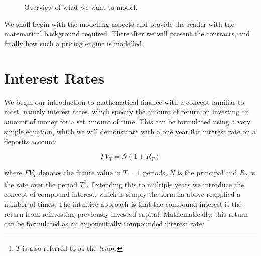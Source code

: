\begin{figure}[h!]
\begin{center}
\begin{minipage}{\linewidth}
\caption{Overview of what we want to model.}
\label{fig:overview}
\end{minipage}
\end{center}
\end{figure}

We shall begin with the modelling aspects and provide the reader with the
matematical background required. Thereafter we will present the contracts, and
finally how such a pricing engine is modelled. 

\section{Interest Rates}

We begin our introduction to mathematical finance with a concept familiar to
most, namely interest rates, which specify the amount of return on
investing an amount of money for a set amount of time. This can be formulated
using a very simple equation, which we will demonstrate with a one year flat
interest rate on a deposits account:

\begin{equation}\label{eq:lincomp}
FV_T = N (1 + R_T)
\end{equation}

where $FV_T$ denotes the future value in $T=1$ periods, $N$ is the principal
and $R_T$ is the rate over the period $T$\footnote{$T$ is also referred to as the
\emph{tenor}.}. Extending this to multiple years we introduce the 
concept of compound interest, which is simply the formula above reapplied
a number of times. The intuitive approach is
that the compound interest is the return from reinvesting previously invested
capital. Mathematically, this return can be formulated as an exponentially 
compounded interest rate:


